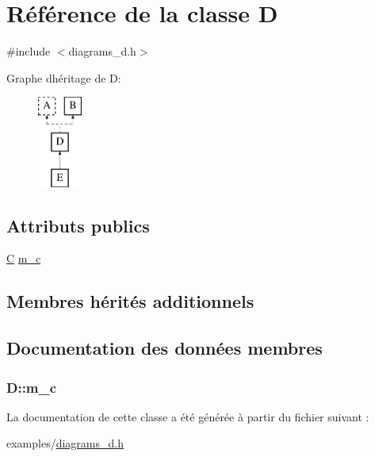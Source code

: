 \hypertarget{class_d}{}\section{Référence de la classe D}
\label{class_d}


{\ttfamily \#include $<$diagrams\+\_\+d.\+h$>$}

Graphe d\textquotesingle{}héritage de D\+:\begin{figure}[H]
\begin{center}
\leavevmode
\includegraphics[height=3.000000cm]{class_d}
\end{center}
\end{figure}
\subsection*{Attributs publics}
\begin{DoxyCompactItemize}
\item 
\hyperlink{class_c}{C} \hyperlink{class_d_a9d877c7aa092f423f2a073f3c62fef9c}{m\+\_\+c}
\end{DoxyCompactItemize}
\subsection*{Membres hérités additionnels}


\subsection{Documentation des données membres}
\hypertarget{class_d_a9d877c7aa092f423f2a073f3c62fef9c}{}
\subsubsection[{m\+\_\+c}]{ D\+::m\+\_\+c}\label{class_d_a9d877c7aa092f423f2a073f3c62fef9c}


La documentation de cette classe a été générée à partir du fichier suivant \+:\begin{DoxyCompactItemize}
\item 
examples/\hyperlink{diagrams__d_8h}{diagrams\+\_\+d.\+h}\end{DoxyCompactItemize}
